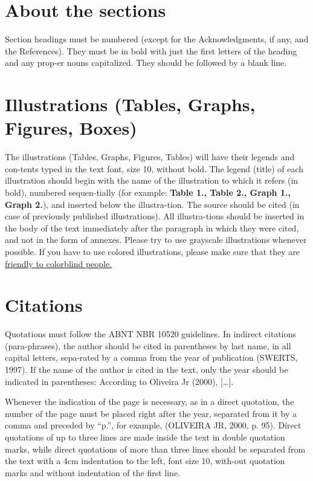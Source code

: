 \documentclass[12pt,a4paper]{article}
\begin{document}
\section{About the sections} 
Section headings must be numbered (except for the Acknowledgments, if any, and the References). They must be in bold with just the first letters of the heading and any prop-er nouns capitalized. They should be followed by a blank line.

\section{Illustrations (Tables, Graphs, Figures, Boxes)} 
The illustrations (Tables, Graphs, Figures, Tables) will have their legends and con-tents typed in the text font, size 10, without bold. The legend (title) of each illustration should begin with the name of the illustration to which it refers (in bold), numbered sequen-tially (for example: \textbf{Table 1., Table 2., Graph 1., Graph 2.}), and inserted below the illustra-tion. The source should be cited (in case of previously published illustrations). All illustra-tions should be inserted in the body of the text immediately after the paragraph in which they were cited, and not in the form of annexes. Please try to use grayscale illustrations whenever possible. If you have to use colored illustrations, please make sure that they are \href{https://jfly.uni-koeln.de/color/index.html}{friendly to colorblind people.} 

\section{Citations} 
Quotations must follow the ABNT NBR 10520 guidelines. In indirect citations (para-phrases), the author should be cited in parentheses by last name, in all capital letters, sepa-rated by a comma from the year of publication (SWERTS, 1997). If the name of the author is cited in the text, only the year should be indicated in parentheses: According to Oliveira Jr (2000), […].

Whenever the indication of the page is necessary, as in a direct quotation, the number of the page must be placed right after the year, separated from it by a comma and preceded by “p.”, for example, (OLIVEIRA JR, 2000, p. 95). Direct quotations of up to three lines are made inside the text in double quotation marks, while direct quotations of more than three lines should be separated from the text with a 4cm indentation to the left, font size 10, with-out quotation marks and without indentation of the first line.
\end{document}
